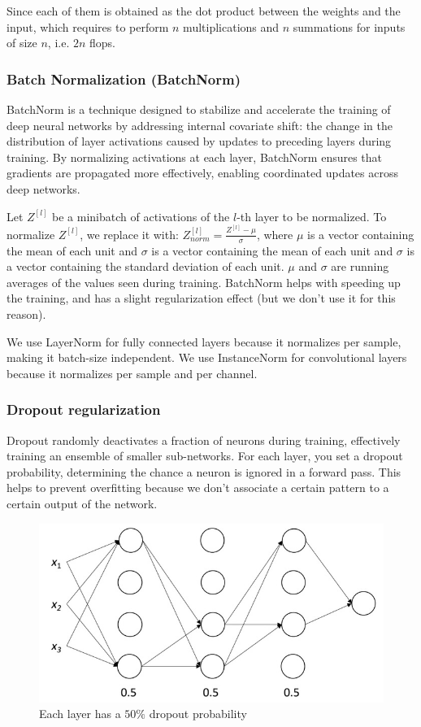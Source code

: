 \documentclass{article}
\begin{document}
Since each of them is obtained as the dot product between the weights and the input, which requires to perform $n$ multiplications and $n$ summations for inputs of size $n$, i.e. $2n$ flops.

\subsubsection{Batch Normalization (BatchNorm)}
BatchNorm is a technique designed to stabilize and accelerate the training of deep neural networks by addressing internal covariate shift: the change in the distribution of layer activations caused by updates to preceding layers during training.
By normalizing activations at each layer, BatchNorm ensures that gradients are propagated more effectively, enabling coordinated updates across deep networks.

Let $Z^{[l]}$ be a minibatch of activations of the $l$-th layer to be normalized.
To normalize $Z^{[l]}$, we replace it with: $Z^{[l]}_{norm} = \frac{Z^[l] - \mu}{\sigma}$, where $\mu$ is a vector containing the mean of each unit and $\sigma$ is a vector containing the mean of each unit and $\sigma$ is a vector containing the standard deviation of each unit.
$\mu$ and $\sigma$ are running averages of the values seen during training.
BatchNorm helps with speeding up the training, and has a slight regularization effect (but we don't use it for this reason).

We use LayerNorm for fully connected layers because it normalizes per sample, making it batch-size independent.
We use InstanceNorm for convolutional layers because it normalizes per sample and per channel.

\subsubsection{Dropout regularization}
Dropout randomly deactivates a fraction of neurons during training, effectively training an ensemble of smaller sub-networks.
For each layer, you set a dropout probability, determining the chance a neuron is ignored in a forward pass.
This helps to prevent overfitting because we don't associate a certain pattern to a certain output of the network.

\begin{figure}[htbp]
  \centering
  \includegraphics[width=0.8\linewidth]{./img/dropout.jpg}
  \caption{Each layer has a $50 \%$ dropout probability}
  \label{fig:convolutions_flops}
\end{figure}
\end{document}
